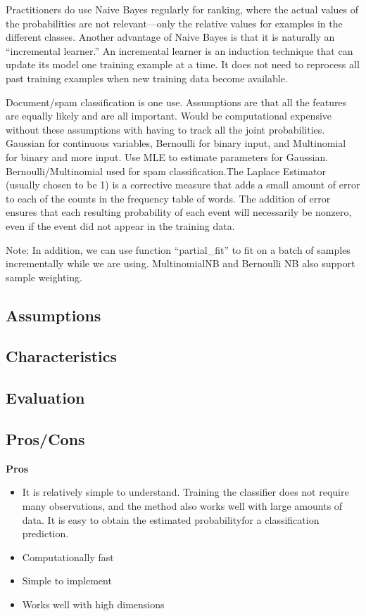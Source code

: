 \documentclass[]{book}
\theoremstyle{definition}
\theoremstyle{definition}
\theoremstyle{definition}
\theoremstyle{remark}
\begin{document}
Practitioners do use Naive Bayes regularly for ranking, where the actual
values of the probabilities are not relevant---only the relative values
for examples in the different classes. Another advantage of Naive Bayes
is that it is naturally an ``incremental learner.'' An incremental
learner is an induction technique that can update its model one training
example at a time. It does not need to reprocess all past training
examples when new training data become available.

Document/spam classification is one use. Assumptions are that all the
features are equally likely and are all important. Would be
computational expensive without these assumptions with having to track
all the joint probabilities. Gaussian for continuous variables,
Bernoulli for binary input, and Multinomial for binary and more input.
Use MLE to estimate parameters for Gaussian. Bernoulli/Multinomial used
for spam classification.The Laplace Estimator (usually chosen to be 1)
is a corrective measure that adds a small amount of error to each of the
counts in the frequency table of words. The addition of error ensures
that each resulting probability of each event will necessarily be
nonzero, even if the event did not appear in the training data.

Note: In addition, we can use function ``partial\_fit'' to fit on a
batch of samples incrementally while we are using. MultinomialNB and
Bernoulli NB also support sample weighting.

\subsection{Assumptions}\label{assumptions}

\subsection{Characteristics}\label{characteristics}

\subsection{Evaluation}\label{evaluation}

\subsection{Pros/Cons}\label{proscons}

\textbf{Pros}

\begin{itemize}
\item
  It is relatively simple to understand. Training the classifier does
  not require many observations, and the method also works well with
  large amounts of data. It is easy to obtain the estimated
  probabilityfor a classification prediction.
\item
  Computationally fast
\item
  Simple to implement
\item
  Works well with high dimensions
\end{itemize}
\end{document}
